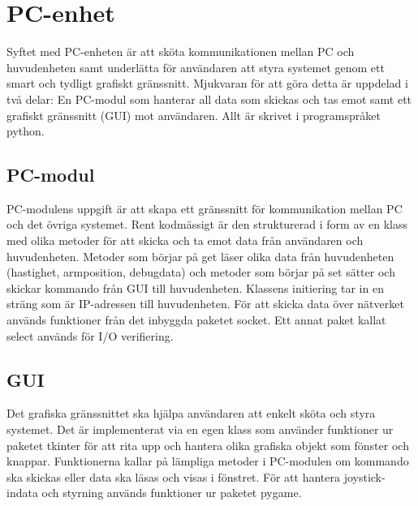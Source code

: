 
\section{PC-enhet}
Syftet med PC-enheten är att sköta kommunikationen mellan PC och huvudenheten samt 
underlätta för användaren att styra systemet genom ett smart och tydligt grafiskt gränssnitt. 
Mjukvaran för att göra detta är uppdelad i två delar: En PC-modul som hanterar all data som 
skickas och tas emot samt ett grafiskt gränssnitt (GUI) mot användaren. Allt är skrivet i 
programspråket python.

\subsection{PC-modul}
PC-modulens uppgift är att skapa ett gränssnitt för kommunikation mellan PC och det övriga 
systemet. Rent kodmässigt är den strukturerad i form av en klass med olika metoder för att skicka 
och ta emot data från användaren och huvudenheten. Metoder som börjar på get läser olika data från 
huvudenheten (hastighet, armposition, debugdata) och metoder som börjar på set sätter och skickar 
kommando från GUI till huvudenheten. Klassens initiering tar in en sträng som är IP-adressen till 
huvudenheten. För att skicka data över nätverket används funktioner från det inbyggda paketet 
socket. Ett annat paket kallat select används för I/O verifiering.

\subsection{GUI}
Det grafiska gränssnittet ska hjälpa användaren att enkelt sköta och styra systemet. 
Det är implementerat via en egen klass som använder funktioner ur paketet tkinter för att rita 
upp och hantera olika grafiska objekt som fönster och knappar. Funktionerna kallar på lämpliga 
metoder i PC-modulen om kommando ska skickas eller data ska läsas och visas i fönstret. För att 
hantera joystick-indata och styrning används funktioner ur paketet pygame. 
